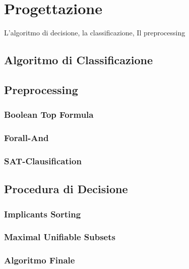\documentclass[./main.tex]{subfiles}
\begin{document}
\chapter{Progettazione}
L'algoritmo di decisione, la classificazione, Il preprocessing
\section{Algoritmo di Classificazione}

\section{Preprocessing}
\subsection{Boolean Top Formula}
\subsection{Forall-And}
\subsection{SAT-Clausification}

\section{Procedura di Decisione}
\subsection{Implicants Sorting}
\subsection{Maximal Unifiable Subsets}
\subsection{Algoritmo Finale}
\end{document}

